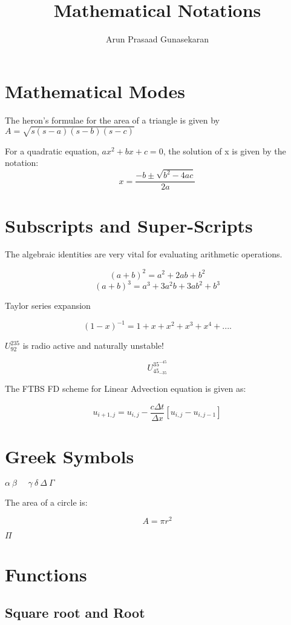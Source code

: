 \documentclass[10pt,a4paper]{article}
\author{Arun Prasaad Gunasekaran}
\title{Mathematical Notations}
\begin{document}
\maketitle

\tableofcontents

\newpage

\section{Mathematical Modes}
The heron's formulae for the area of a triangle is given by $A = \sqrt{s(s-a)(s-b)(s-c)} $

For a quadratic equation, $ax^2 + bx + c = 0$, the solution of x is given by the notation: $$ x = \frac{-b \pm \sqrt{b^2 -4ac}}{2a}$$

\section{Subscripts and Super-Scripts}

The algebraic identities are very vital for evaluating arithmetic operations.

$$ (a+b)^2 = a^2 + 2ab + b^2 $$
$$ (a+b)^3 = a^3 + 3a^2b + 3ab^2 + b^3$$

Taylor series expansion

$$ (1-x)^{-1} = 1 + x + x^2 + x^3 + x^4 + .... $$

$U^{235}_{92}$ is radio active and naturally unstable!

$$ U^{35^{-45}}_{{45}_{-35}}$$

The FTBS FD scheme for Linear Advection equation is given as:

$$ u_{i+1,j} = u_{i,j} - \frac{c\Delta t}{\Delta x}[u_{i,j}-u_{i,j-1}]$$

\section{Greek Symbols}
$\alpha\ \beta\ \ \ \ \ \ \gamma\ \delta\ \Delta\ \Gamma$

The area of a circle is:

$$ A = \pi r^2$$

$\Pi$

\section{Functions}

\subsection{Square root and Root}
\end{document}

